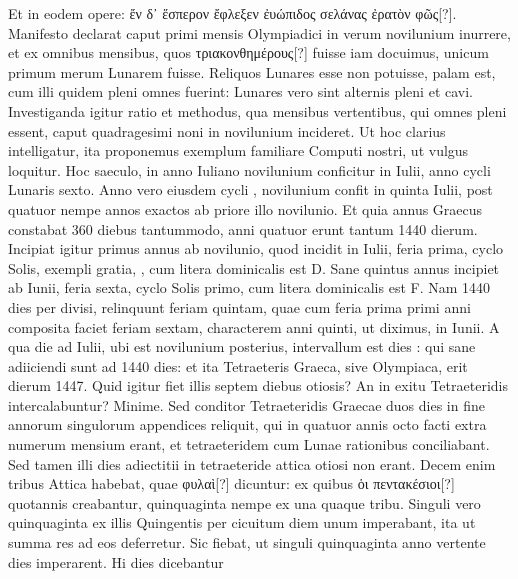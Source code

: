 Et in eodem opere: \textgreek{ἔν δ᾽ ἕσπερον ἔφλεξεν
ἐυώπιδος σελάνας ἐρατὸν φῶς[?]}.
Manifesto declarat caput primi mensis
Olympiadici in verum novilunium inurrere, et ex omnibus mensibus,
quos \textgreek{τριακονθημέρους[?]} fuisse iam docuimus, unicum primum merum
Lunarem fuisse.
Reliquos Lunares esse non potuisse, palam est, cum illi
quidem pleni omnes fuerint: Lunares vero sint alternis pleni et cavi.
Investiganda
igitur ratio et methodus, qua  mensibus vertentibus,
qui omnes pleni essent, caput quadragesimi noni in novilunium
incideret.
Ut hoc clarius intelligatur, ita proponemus exemplum familiare
Computi nostri, ut vulgus loquitur.
Hoc saeculo, in anno Iuliano
novilunium conficitur in  Iulii, anno cycli Lunaris sexto.
Anno vero
eiusdem cycli , novilunium confit in quinta Iulii, post quatuor
nempe annos exactos ab priore illo novilunio.
Et quia annus Graecus
constabat 360 diebus tantummodo, anni quatuor erunt tantum 1440
dierum.
Incipiat igitur primus annus ab novilunio, quod incidit in 
Iulii, feria prima, cyclo Solis, exempli gratia,
 , cum litera dominicalis
est D.
Sane quintus annus incipiet ab  Iunii,
 feria sexta, cyclo Solis
primo, cum litera dominicalis est F.
Nam 1440 dies per  divisi,
relinquunt feriam quintam, quae cum feria prima primi anni composita
faciet feriam sextam, characterem anni quinti, ut diximus, in
  Iunii.
A qua die ad  Iulii, ubi est novilunium posterius,
 intervallum est
dies : qui sane adiiciendi sunt ad 1440 dies: et ita
 Tetraeteris Graeca,
sive Olympiaca, erit dierum 1447.
Quid igitur fiet illis septem diebus
otiosis?
An in exitu Tetraeteridis intercalabuntur?
Minime.
Sed conditor
Tetraeteridis Graecae duos dies in fine annorum singulorum appendices
reliquit, qui in quatuor annis octo facti extra numerum mensium
erant, et tetraeteridem cum Lunae rationibus conciliabant.
Sed tamen
illi dies adiectitii in tetraeteride attica otiosi non erant.
Decem enim
tribus Attica habebat, quae \textgreek{φυλαὶ[?]} dicuntur: ex quibus
 \textgreek{ὁι πεντακέσιοι[?]}
quotannis creabantur, quinquaginta nempe ex una quaque tribu.
Singuli
vero quinquaginta ex illis Quingentis per cicuitum diem unum
imperabant, ita ut summa res ad eos deferretur.
Sic fiebat, ut singuli
quinquaginta anno vertente  dies imperarent.
Hi dies dicebantur
